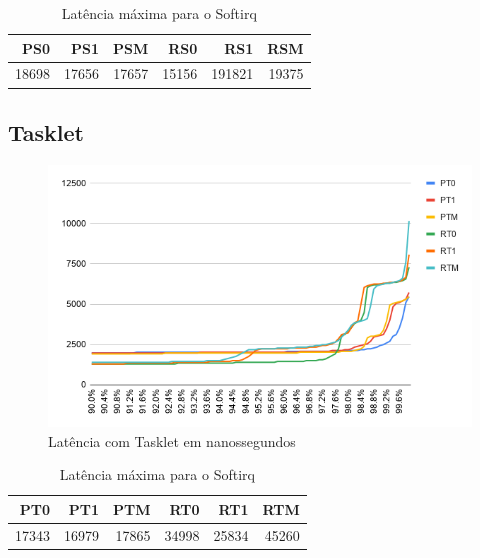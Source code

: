 \begin{table}[H]
\centering
\begin{center}
\begin{tabular}{|r|r|r|r|r|r|}
\toprule
    PS0 &    PS1 &    PSM &    RS0 &     RS1 &    RSM \\
\midrule
    18698 &	17656 &	17657 & 15156 & 191821 &	19375 \\
\bottomrule
\end{tabular}
\end{center}
\caption{Latência máxima para o Softirq}
\label{table:max-softirq}
\end{table}

\subsection{Tasklet}

\begin{figure}[H]
  \centering
        \includegraphics[width=\textwidth]{graficos/tasklet.png}
        \caption{Latência com Tasklet em nanossegundos}
        \label{grafico:tasklet}
\end{figure}

\begin{table}[H]
\centering
\begin{center}
\begin{tabular}{|r|r|r|r|r|r|}
\toprule
    PT0 &    PT1 &    PTM &    RT0 &     RT1 &    RTM \\
\midrule
    17343 &	16979 &	17865 & 34998 &	25834 &	45260 \\
\bottomrule
\end{tabular}
\end{center}
\caption{Latência máxima para o Softirq}
\label{table:max-softirq}
\end{table}

